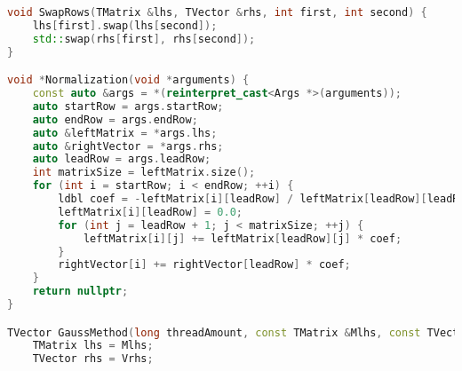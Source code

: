 \documentclass[a4paper, 12pt]{article}
\begin{document}
\begin{lstlisting}[language=C++]
void SwapRows(TMatrix &lhs, TVector &rhs, int first, int second) {
    lhs[first].swap(lhs[second]);
    std::swap(rhs[first], rhs[second]);
}

void *Normalization(void *arguments) {
    const auto &args = *(reinterpret_cast<Args *>(arguments));
    auto startRow = args.startRow;
    auto endRow = args.endRow;
    auto &leftMatrix = *args.lhs;
    auto &rightVector = *args.rhs;
    auto leadRow = args.leadRow;
    int matrixSize = leftMatrix.size();
    for (int i = startRow; i < endRow; ++i) {
        ldbl coef = -leftMatrix[i][leadRow] / leftMatrix[leadRow][leadRow];
        leftMatrix[i][leadRow] = 0.0;
        for (int j = leadRow + 1; j < matrixSize; ++j) {
            leftMatrix[i][j] += leftMatrix[leadRow][j] * coef;
        }
        rightVector[i] += rightVector[leadRow] * coef;
    }
    return nullptr;
}

TVector GaussMethod(long threadAmount, const TMatrix &Mlhs, const TVector &Vrhs) {
    TMatrix lhs = Mlhs;
    TVector rhs = Vrhs;


\end{lstlisting}
\end{document}
